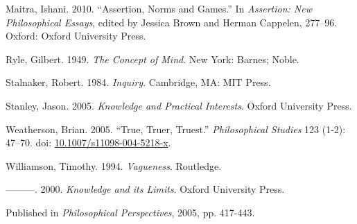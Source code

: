 \documentclass[
  11pt,
  letterpaper,
  DIV=11,
  numbers=noendperiod,
  twoside]{scrartcl}
\newlength{\cslhangindent}
\newenvironment{CSLReferences}[2] %
 {\begin{list}{}{%
  \setlength{\itemindent}{0pt}
  \setlength{\leftmargin}{0pt}
  \setlength{\parsep}{0pt}
  \ifodd #1
   \setlength{\leftmargin}{\cslhangindent}
   \setlength{\itemindent}{-1\cslhangindent}
  \fi
  \setlength{\itemsep}{#2\baselineskip}}}
 {\end{list}}
\begin{document}
\begin{CSLReferences}{1}{0}
Maitra, Ishani. 2010. {``Assertion, Norms and Games.''} In
\emph{Assertion: New Philosophical Essays}, edited by Jessica Brown and
Herman Cappelen, 277--96. Oxford: Oxford University Press.

Ryle, Gilbert. 1949. \emph{The Concept of Mind}. New York: Barnes;
Noble.

Stalnaker, Robert. 1984. \emph{Inquiry}. Cambridge, MA: MIT Press.

Stanley, Jason. 2005. \emph{{Knowledge and Practical Interests}}. Oxford
University Press.

Weatherson, Brian. 2005. {``{True, Truer, Truest}.''}
\emph{Philosophical Studies} 123 (1-2): 47--70. doi:
\href{https://doi.org/10.1007/s11098-004-5218-x}{10.1007/s11098-004-5218-x}.

Williamson, Timothy. 1994. \emph{{Vagueness}}. Routledge.

---------. 2000. \emph{{Knowledge and its Limits}}. Oxford University
Press.

\end{CSLReferences}



\noindent Published in\emph{
Philosophical Perspectives}, 2005, pp. 417-443.
\end{document}
